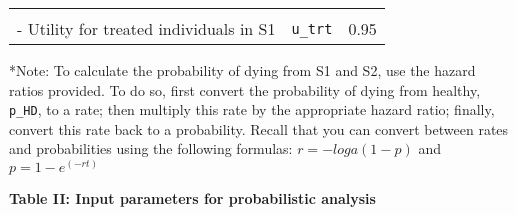 \documentclass[]{article}
\begin{document}
\begin{longtable}[]{@{}llc@{}}
\begin{minipage}[t]{0.20\columnwidth}
\strut
\end{minipage}\tabularnewline
\begin{minipage}[t]{0.47\columnwidth}\raggedright\strut
- Utility for treated individuals in S1\strut
\end{minipage} & \begin{minipage}[t]{0.18\columnwidth}\raggedright\strut
\texttt{u\_trt}\strut
\end{minipage} & \begin{minipage}[t]{0.20\columnwidth}\centering\strut
0.95\strut
\end{minipage}\tabularnewline
\bottomrule
\end{longtable}

*Note: To calculate the probability of dying from S1 and S2, use the
hazard ratios provided. To do so, first convert the probability of dying
from healthy, \texttt{p\_HD}, to a rate; then multiply this rate by the
appropriate hazard ratio; finally, convert this rate back to a
probability. Recall that you can convert between rates and probabilities
using the following formulas: \(r = -loga(1-p)\) and \(p = 1-e^{(-rt)}\)

\textbf{Table II: Input parameters for probabilistic analysis}
\end{document}
